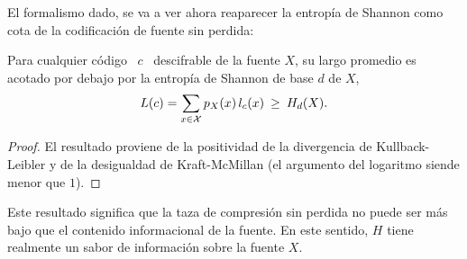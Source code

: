El formalismo dado,  se va a ver ahora reaparecer la  entrop\'ia de Shannon como
cota de la codificaci\'on de fuente sin perdida:

\begin{teorema}
\label{Teo:SZ:CotaInferiorCodigosDescifrables}
%
  Para  cualquier c\'odigo  \  $c$ \  descifrable  de la  fuente  $X$, su  largo
  promedio es  acotado por debajo  por la entrop\'ia  de Shannon de base  $d$ de
  $X$,
  \[
  L(c) = \sum_{x \in \mathcal{X}} p_X(x) \, l_c(x) \: \ge \: H_d(X).
  \]
\end{teorema}
%
\begin{proof}
  El resultado proviene de la  positividad de la divergencia de Kullback-Leibler
  y de la desigualdad de Kraft-McMillan (el argumento del logaritmo siende menor
  que $1$).
\end{proof}
%
\noindent Este  resultado significa que la  taza de compresi\'on  sin perdida no
puede  ser m\'as  bajo que  el  contenido informacional  de la  fuente. En  este
sentido, $H$ tiene realmente un sabor de informaci\'on sobre la fuente $X$.

